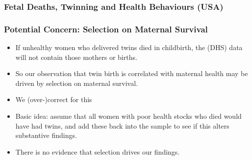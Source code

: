 \documentclass[9pt,letterpaper,subeqn]{beamer}
\begin{document}
\begin{frame}[label=TwinDeathUSA]
  \frametitle{Fetal Deaths, Twinning and Health Behaviours (USA)}

\hyperlink{fdgraph}{}
\end{frame}





\begin{frame}[label=selectest]
  \frametitle{Potential Concern: Selection on Maternal Survival}
\begin{itemize}
\item If unhealthy women who delivered twins died in childbirth, the (DHS) data will not contain those mothers or births.
\item So our observation that twin birth is correlated with maternal health may be driven by selection on maternal survival. 
\item We (over-)correct for this
\item Basic idea: assume that all women with poor health stocks who died would have had twins, and add these back into the sample to see if this alters substantive findings. \hyperlink{MMRselec}{} 
\item There is no evidence that selection drives our findings.
\end{itemize}
\end{frame}
\end{document}
